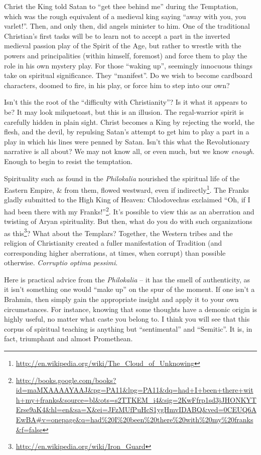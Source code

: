 Christ the King told Satan to ``get thee behind me'' during the Temptation, which was the rough equivalent of a medieval king saying ``away with you, you varlet!''. Then, and only then, did angels minister to him. One of the traditional Christian's first tasks will be to learn not to accept a part in the inverted medieval passion play of the Spirit of the Age, but rather to wrestle with the powers and principalities (within himself, foremost) and force them to play the role in his own mystery play. For those ``waking up'', seemingly innocuous things take on spiritual significance. They ``manifest''. Do we wish to become cardboard characters, doomed to fire, in his play, or force him to step into our own?

Isn't this the root of the ``difficulty with Christianity''? Is it what it appears to be? It may look milquetoast, but this is an illusion. The regal-warrior spirit is carefully hidden in plain sight. Christ becomes a King by rejecting the world, the flesh, and the devil, by repulsing Satan's attempt to get him to play a part in a play in which his lines were penned by Satan. Isn't this what the Revolutionary narrative is all about? We may not know all, or even much, but we know \emph{enough}. Enough to begin to resist the temptation.

Spirituality such as found in the \emph{Philokalia} nourished the spiritual life of the Eastern Empire, \& from them, flowed westward, even if indirectly\footnote{\url{http://en.wikipedia.org/wiki/The\_Cloud\_of\_Unknowing}}. The Franks gladly submitted to the High King of Heaven: Chlodovechus exclaimed ``Oh, if I had been there with my Franks!''\footnote{\url{http://books.google.com/books?id=maMXAAAAYAAJ&pg=PA11&lpg=PA11&dq=had+I+been+there+with+my+franks&source=bl&ots=s2TTKEM_i4&sig=2KwFfrp1sd3jJHONKYTErse9aK4&hl=en&sa=X&ei=JFzMUfPuHcS1ygHmvIDABQ&ved=0CEUQ6AEwBA\#v=onepage&q=had\%20I\%20been\%20there\%20with\%20my\%20franks&f=false}}. It's possible to view this as an aberration and twisting of Aryan spirituality. But then, what do you do with such organizations as this\footnote{\url{http://en.wikipedia.org/wiki/Iron\_Guard}}? What about the Templars? Together, the Western tribes and the religion of Christianity created a fuller manifestation of Tradition (and corresponding higher aberrations, at times, when corrupt) than possible otherwise. \emph{Corruptio optima pessimi}.


Here is practical advice from the \emph{Philokalia} -- it has the smell of authenticity, as it isn't something one would ``make up'' on the spur of the moment. If one isn't a Brahmin, then simply gain the appropriate insight and apply it to your own circumstances. For instance, knowing that some thoughts have a demonic origin is highly useful, no matter what caste you belong to. I think you will see that this corpus of spiritual teaching is anything but ``sentimental'' and ``Semitic''. It is, in fact, triumphant and almost Promethean.

